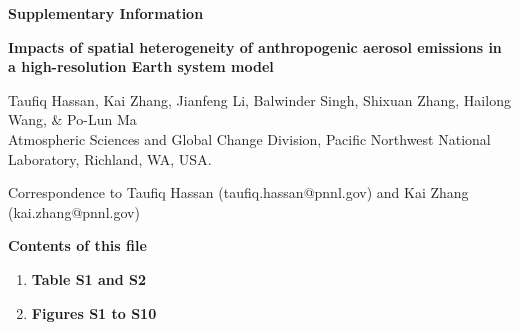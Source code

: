 \documentclass[journal abbreviation, manuscript]{copernicus}
\begin{document}
\begin{center} 
\large \bf{Supplementary Information}
\end{center}

\begin{center}
\linespread{1.5}
\Large\bf{Impacts of spatial heterogeneity of anthropogenic aerosol emissions in a high-resolution Earth system model\\}
\end{center}

\begin{center}
\linespread{2}
\large{Taufiq Hassan, Kai Zhang, Jianfeng Li, Balwinder Singh, Shixuan Zhang, Hailong Wang, \& Po-Lun Ma\\}
\small{Atmospheric Sciences and Global Change Division, Pacific Northwest National Laboratory, Richland, WA, USA.\\}
\end{center}

\small{Correspondence to Taufiq Hassan (taufiq.hassan@pnnl.gov) and Kai Zhang (kai.zhang@pnnl.gov)}

\newpage
\noindent\textbf{Contents of this file}
\begin{enumerate}
\linespread{2}
\item {\bf Table S1 and S2}
\item {\bf Figures S1 to S10}
\end{enumerate}
\end{document}

